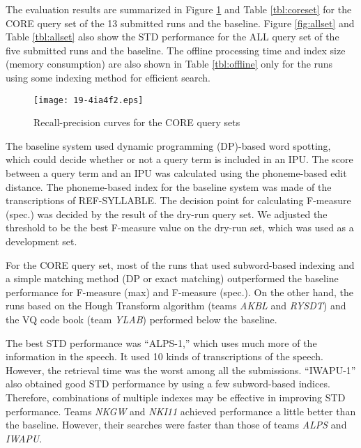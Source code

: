 \documentclass[english]{jnlp_1.4}
\begin{document}
The evaluation results are summarized in Figure \ref{fig:coreset} and
Table \ref{tbl:coreset} for the CORE query set of the 13 submitted runs
and the baseline.
Figure \ref{fig:allset} and Table \ref{tbl:allset} also show the STD
performance for the ALL query set of the five submitted runs and the
baseline. 
The offline processing time and index size (memory consumption) are also
shown in Table \ref{tbl:offline} only for the runs using some indexing
method for efficient search.

\begin{figure}[b]
\begin{center}
\texttt{[image: 19-4ia4f2.eps]}
\end{center}
\caption{Recall-precision curves for the CORE query sets}
\label{fig:coreset}
\end{figure}

The baseline system used dynamic programming (DP)-based word
spotting, which could decide whether or not a query term is included in
an IPU.
The score between a query term and an IPU was calculated using
the phoneme-based edit distance. The phoneme-based index for the
baseline system was made of the transcriptions of REF-SYLLABLE.  The
decision point for calculating F-measure (spec.) was decided by the
result of the dry-run query set. We adjusted the threshold to be the
best F-measure value on the dry-run set, which was used as a
development set.

For the CORE query set, most of the runs that used subword-based indexing
and a simple matching method (DP or exact matching) outperformed the
baseline performance for F-measure (max) and F-measure (spec.). 
On the other hand, the runs based on the Hough Transform algorithm 
(teams \textit{AKBL} and \textit{RYSDT}) and the VQ code book 
(team \textit{YLAB}) performed below the baseline. 

\begin{table}[t]
\label{tbl:coreset}

\end{table}

The best STD performance was ``ALPS-1,'' which uses much more of the
information in the speech. 
It used 10 kinds of transcriptions of the speech. 
However, the retrieval time was the worst among all the submissions. 
``IWAPU-1'' also obtained good STD performance by using a few
subword-based indices. 
Therefore, combinations of multiple indexes may be effective in
improving STD performance. 
Teams {\it NKGW} and {\it NKI11} achieved performance a little better
than the baseline. However, their searches were faster than those of
teams {\it ALPS} and {\it IWAPU}.
\end{document}
